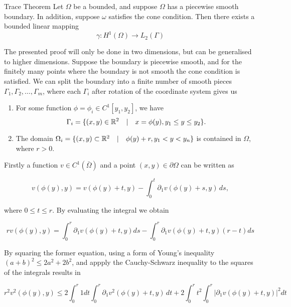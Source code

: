 \begin{defn}{Trace Theorem}\label{defn:trace}
    Let $\Omega$ be a bounded, and suppose $\Omega$ has a piecewise smooth boundary. In addition, suppose $\omega$ satisfies the cone condition. Then there exists a bounded linear mapping
    \begin{equation*}
        \gamma : H^1(\Omega) \to L_2(\Gamma)
    \end{equation*}
\end{defn}
\begin{bev}
    The presented proof will only be done in two dimensions, but can be generalised to higher dimensions.
    Suppose the boundary is piecewise smooth, and for the finitely many points where the boundary is not smooth the cone condition is satisfied. We can split the boundary into a finite number of smooth pieces $\Gamma_1, \Gamma_2, \dots, \Gamma_m$, where each $\Gamma_i$ after rotation of the coordinate system gives us

    \begin{enumerate}
        \item For some function $\phi = \phi_i \in C^1[y_1, y_2]$, we have
            \[ \Gamma_i = \{ (x,y) \in \mathbb{R}^2 \quad | \quad x = \phi(y), y_1 \leq y \leq y_2 \}. \]
        \item The domain $\Omega_i = \{ (x,y) \subset \mathbb{R}^2 \quad | \quad \phi(y) + r, y_1 < y < y_n \}$ is contained in $\Omega$, where $r > 0$.
    \end{enumerate}

    Firstly a function $v \in C^1(\bar{\Omega})$ and a point $(x,y) \in \partial \Omega$ can be written as

    \begin{equation}
        v(\phi(y), y) = v(\phi(y) + t, y) - \int_0^t \partial_1 v(\phi(y) + s, y) \, ds,
    \end{equation}

    where $0 \leq t \leq r$. By evaluating the integral we obtain

    \begin{equation}
        r v(\phi(y), y) = \int_0^r \partial_1 v(\phi(y) + t, y) ds - \int_0^r \partial_1 v(\phi(y) + t, y)(r-t) ds
    \end{equation}

    By squaring the former equation, using a form of Young's inequality ${(a+b)}^2 \leq 2a^2 + 2b^2$, and appply the Cauchy-Schwarz inequality to the squares of the integrals results in

    \begin{equation}
        r^2 v^2(\phi(y), y) \leq 2 \int_0^r 1 dt \int_0^r \partial_1 v^2(\phi(y) + t, y) \, dt +  2\int_0^r t^2 \int_0^r | \partial_1  v(\phi(y) + t, y) |^2 dt
    \end{equation}


\end{bev}
